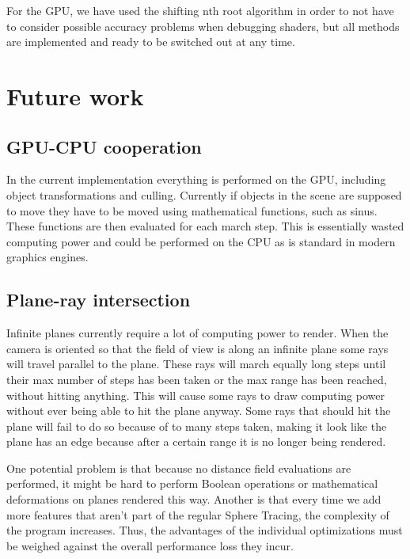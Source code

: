 		For the GPU, we have used the shifting nth root algorithm in order
		to not have to consider possible accuracy problems when debugging
		shaders, but all methods are implemented and ready to be switched out
		at any time.
		

	\section{Future work} \label{futureoptimizations} 

		\subsection{GPU-CPU cooperation}

			In the current implementation everything is performed on the GPU,
			including object transformations and culling. Currently if objects
			in the scene are supposed to move they have to be moved using
			mathematical functions, such as sinus. These functions are then
			evaluated for each march step. This is essentially wasted computing
			power and could be performed on the CPU as is standard in modern
			graphics engines.

		\subsection{Plane-ray intersection}

			Infinite planes currently require a lot of computing power to
			render. When the camera is oriented so that the field of view is
			along an infinite plane some rays will travel parallel to the
			plane. These rays will march equally long steps until their max
			number of steps has been taken or the max range has been reached, 
			without hitting anything. This will cause some rays to draw 
			computing power without ever being able to hit the plane anyway. 
			Some rays that should hit the plane will fail to do so because of 
			to many steps taken, making it look like the plane has an edge 
			because after a certain range it is no longer being rendered.

			One potential problem is that because no distance field evaluations 
			are performed, it might be hard to perform Boolean operations or 
			mathematical deformations on planes rendered this way. Another is 
			that every time we add more features that aren't part of the 
			regular Sphere Tracing, the complexity of the program increases. 
			Thus, the advantages of the individual optimizations must be 
			weighed against the overall performance loss they incur. 


